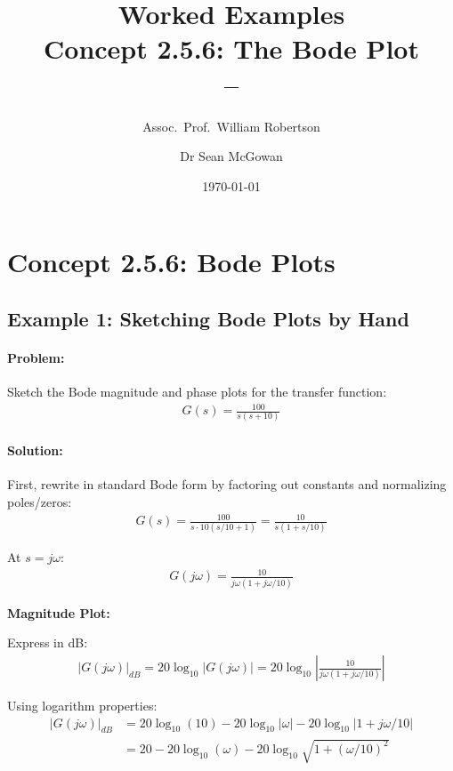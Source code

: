 \documentclass[11pt,a4paper]{article}
\title{\textbf{Worked Examples}\\[0.5em]
\large Concept 2.5.6: The Bode Plot\\[0.3em]
\normalsize \coursesubtitle{} -- \coursetitle}
\author{Assoc.\ Prof.\ William Robertson \and Dr Sean McGowan}
\date{\today}
\begin{document}
\maketitle
\tableofcontents
\newpage

\section{Concept 2.5.6: Bode Plots}

\subsection{Example 1: Sketching Bode Plots by Hand}

\paragraph{Problem:} Sketch the Bode magnitude and phase plots for the transfer function:
\begin{align}
  G(s) = \frac{100}{s(s+10)}
\end{align}

\paragraph{Solution:}

First, rewrite in standard Bode form by factoring out constants and normalizing poles/zeros:
\begin{align}
  G(s) = \frac{100}{s \cdot 10(s/10 + 1)} = \frac{10}{s(1 + s/10)}
\end{align}

At $s = j\omega$:
\begin{align}
  G(j\omega) = \frac{10}{j\omega(1 + j\omega/10)}
\end{align}

\textbf{Magnitude Plot:}

Express in dB:
\begin{align}
  |G(j\omega)|_{dB} = 20\log_{10}|G(j\omega)| = 20\log_{10}\left|\frac{10}{j\omega(1 + j\omega/10)}\right|
\end{align}

Using logarithm properties:
\begin{align}
  |G(j\omega)|_{dB} &= 20\log_{10}(10) - 20\log_{10}|\omega| - 20\log_{10}|1 + j\omega/10| \\
  &= 20 - 20\log_{10}(\omega) - 20\log_{10}\sqrt{1 + (\omega/10)^2}
\end{align}
\end{document}
